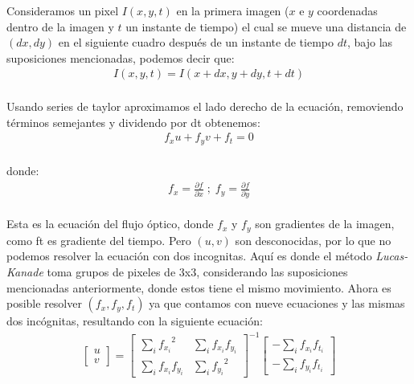 \documentclass{iccmemoria}
\begin{document}
Consideramos un pixel $I(x, y,t)$ en la primera imagen ($x$ e $y$ coordenadas dentro de la imagen y $t$ un instante de tiempo) el cual se mueve una distancia de $(dx, dy)$ en el siguiente cuadro después de un instante de tiempo $dt$, bajo las suposiciones mencionadas, podemos decir que:\\

\begin{equation}
	\begin{split}
		I(x,y,t) = I(x+dx, y+dy, t+dt)
	\end{split}
\end{equation}
\\

Usando series de taylor aproximamos el lado derecho de la ecuación, removiendo términos semejantes y dividendo por dt obtenemos:\\

\begin{equation}
	\begin{split}
		f_x u + f_y v + f_t = 0
	\end{split}
\end{equation}\\

donde:\\

\begin{equation}
	\begin{split}
		f_x = \frac{\partial f}{\partial x} \; ; \; f_y = \frac{\partial f}{\partial y}
	\end{split}
\end{equation}\\

Esta es la ecuación del flujo óptico, donde $f_x$ y $f_y$ son gradientes de la imagen, como ft es gradiente del tiempo. Pero $(u, v)$ son desconocidas, por lo que no podemos resolver la ecuación con dos incognitas. Aquí es donde el método \emph{Lucas-Kanade} toma grupos de pixeles de 3x3, considerando las suposiciones mencionadas anteriormente, donde estos tiene el mismo movimiento. Ahora es posible resolver $(f_x, f_y, f_t)$ ya que contamos con nueve ecuaciones y las mismas dos incógnitas, resultando con la siguiente ecuación:\\

\begin{equation}
	\begin{split}
		\begin{bmatrix} u \\ v \end{bmatrix} = \begin{bmatrix} \sum_{i}{f_{x_i}}^2 & \sum_{i}{f_{x_i} f_{y_i} } \\ \sum_{i}{f_{x_i} f_{y_i}} & \sum_{i}{f_{y_i}}^2 \end{bmatrix}^{-1} \begin{bmatrix} - \sum_{i}{f_{x_i} f_{t_i}} \\ - \sum_{i}{f_{y_i} f_{t_i}} \end{bmatrix}
	\end{split}
\end{equation}\\
\end{document}
